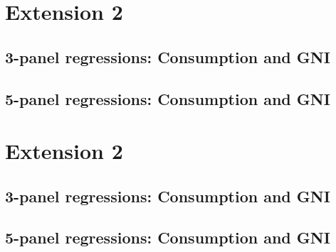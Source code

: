 \documentclass{article}
\begin{document}

\clearpage
\section{Extension 2}

\subsection*{3-panel regressions: Consumption and GNI}


\FloatBarrier

\clearpage
\subsection*{5-panel regressions: Consumption and GNI}


\FloatBarrier



\clearpage
\section{Extension 2}

\subsection*{3-panel regressions: Consumption and GNI}


\FloatBarrier

\clearpage
\subsection*{5-panel regressions: Consumption and GNI}


\FloatBarrier
\end{document}
